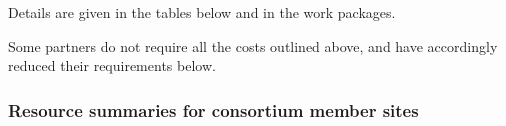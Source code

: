 Details are given in the tables below and in the work packages.

\bigskip

\noindent Some partners do not require all the costs outlined above, and have
accordingly reduced their requirements below.
\bigskip


 \subsubsection{Resource summaries for consortium member sites}
 \label{resources.summary}


